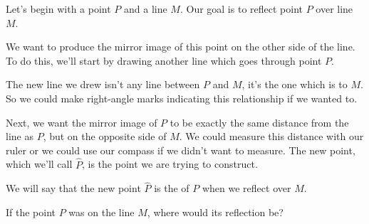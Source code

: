\documentclass{ximera}
\begin{document}
\begin{example}
	Let's begin with a point $P$ and a line $M$. Our goal is to reflect point $P$ over line $M$.
\begin{center}
\end{center}
We want to produce the mirror image of this point on the other side of the line. To do this, we'll start by drawing another line which goes through point $P$.
\begin{center}
\end{center}
The new line we drew isn't any line between $P$ and $M$, it's the one which is  to $M$. So we could make right-angle marks indicating this relationship if we wanted to.

Next, we want the mirror image of $P$ to be exactly the same distance from the line as $P$, but on the opposite side of $M$. We could measure this distance with our ruler or we could use our compass if we didn't want to measure. The new point, which we'll call $\hat{P}$, is the point we are trying to construct.
\begin{center}
\end{center}

\end{example}
We will say that the new point $\hat{P}$ is the  of $P$ when we reflect over $M$.
\begin{question}
If the point $P$ was on the line $M$, where would its reflection be?
\begin{multipleChoice}
\end{multipleChoice}
\end{question}
\end{document}
